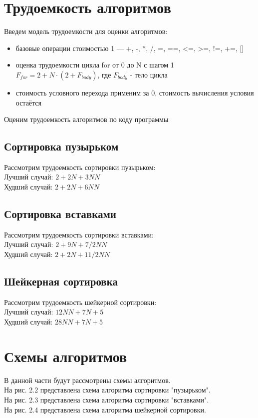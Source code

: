 \documentclass[12pt]{report}
\begin{document}
\section{Трудоемкость алгоритмов}
Введем модель трудоемкости для оценки алгоритмов: 
\begin{itemize}
	\item базовые операции стоимостью 1 — +, -, *, /, =, ==, <=, >=, !=, +=, []
	\item оценка трудоемкости цикла for от 0 до N с шагом 1 $F_{for} = 2 + N \cdot (2 + F_{body})$, где $F_{body}$ - тело цикла
	\item стоимость условного перехода применим за 0, стоимость вычисления условия остаётся
\end{itemize}

Оценим трудоемкость алгоритмов по коду программы

\subsection{Сортировка пузырьком}
Рассмотрим трудоемкость сортировки пузырьком:\\

Лучший случай: $2 + 2N + 3NN$ \\

Худший случай: $2 + 2N + 6NN$



\subsection{Сортировка вставками}

Рассмотрим трудоемкость сортировки вставками:\\

Лучший случай: $2 + 9N + 7/2NN$ \\

Худший случай: $2 + 2N + 11/2NN$


\subsection{Шейкерная сортировка}

Рассмотрим трудоемкость шейкерной сортировки:\\


Лучший случай: $12NN + 7N + 5$ \\

Худший случай: $28NN + 7N + 5$

\section{Схемы алгоритмов}
В данной части будут рассмотрены схемы алгоритмов. \\
На рис. 2.2 представлена  схема алгоритма сортировки "пузырьком".\\
На рис. 2.3 представлена  схема алгоритма сортировки "вставками".\\
На рис. 2.4 представлена  схема алгоритма шейкерной сортировки.\\
\end{document}
